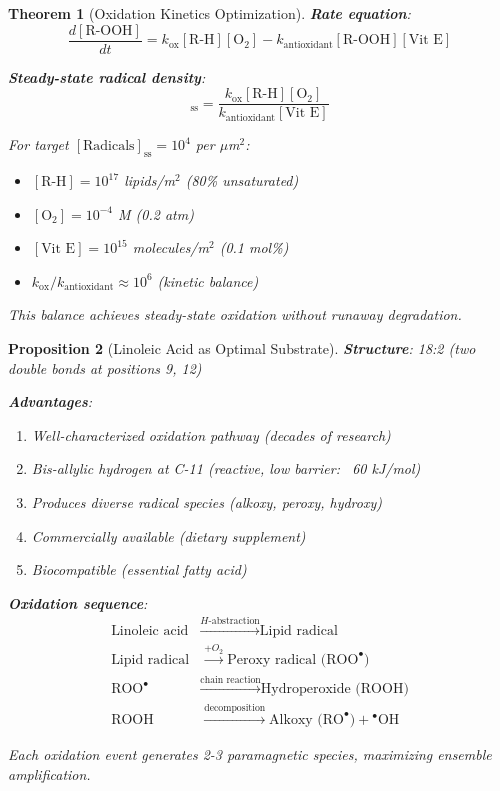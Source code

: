\documentclass[11pt,a4paper]{article}
\newtheorem{theorem}{Theorem}[section]
\newtheorem{proposition}[theorem]{Proposition}
\theoremstyle{definition}
\theoremstyle{remark}
\begin{document}
\begin{theorem}[Oxidation Kinetics Optimization]
\textbf{Rate equation}:
\begin{equation}
\frac{d[\text{R-OOH}]}{dt} = k_{\text{ox}}[\text{R-H}][\text{O}_2] - k_{\text{antioxidant}}[\text{R-OOH}][\text{Vit E}]
\end{equation}

\textbf{Steady-state radical density}:
\begin{equation}
[\text{Radicals}]_{\text{ss}} = \frac{k_{\text{ox}}[\text{R-H}][\text{O}_2]}{k_{\text{antioxidant}}[\text{Vit E}]}
\end{equation}

For target $[\text{Radicals}]_{\text{ss}} = 10^4$ per $\mu$m$^2$:
\begin{itemize}
\item $[\text{R-H}] = 10^{17}$ lipids/m$^2$ (80\% unsaturated)
\item $[\text{O}_2] = 10^{-4}$ M (0.2 atm)
\item $[\text{Vit E}] = 10^{15}$ molecules/m$^2$ (0.1 mol\%)
\item $k_{\text{ox}} / k_{\text{antioxidant}} \approx 10^6$ (kinetic balance)
\end{itemize}

This balance achieves steady-state oxidation without runaway degradation.
\end{theorem}

\begin{proposition}[Linoleic Acid as Optimal Substrate]
\textbf{Structure}: 18:2 (two double bonds at positions 9, 12)

\textbf{Advantages}:
\begin{enumerate}
\item Well-characterized oxidation pathway (decades of research)
\item Bis-allylic hydrogen at C-11 (reactive, low barrier: ~60 kJ/mol)
\item Produces diverse radical species (alkoxy, peroxy, hydroxy)
\item Commercially available (dietary supplement)
\item Biocompatible (essential fatty acid)
\end{enumerate}

\textbf{Oxidation sequence}:
\begin{align}
\text{Linoleic acid} &\xrightarrow{H\text{-abstraction}} \text{Lipid radical} \\
\text{Lipid radical} &\xrightarrow{+O_2} \text{Peroxy radical (ROO}^\bullet\text{)} \\
\text{ROO}^\bullet &\xrightarrow{\text{chain reaction}} \text{Hydroperoxide (ROOH)} \\
\text{ROOH} &\xrightarrow{\text{decomposition}} \text{Alkoxy (RO}^\bullet\text{)} + {}^\bullet\text{OH}
\end{align}

Each oxidation event generates 2-3 paramagnetic species, maximizing ensemble amplification.
\end{proposition}
\end{document}
